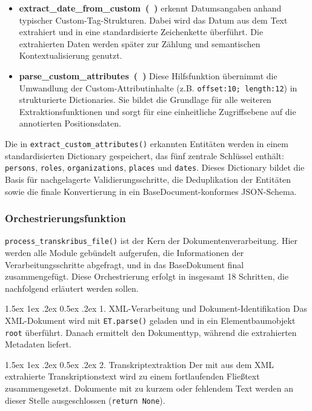 \documentclass[12pt, a4paper, ngerman, bidi=default]{article}
\makeatletter
\newcommand{\code}[1]{\colorbox{VeryLightGray}{\texttt{#1}}} %
\let\oldparagraph\paragraph%
\renewcommand{\paragraph}{
    \@ifstar%
      \xxxParagraphStar%
      \xxxParagraphNoStar%
 }
\newcommand{\xxxParagraphStar}[1]{\oldparagraph*{#1}\mbox{}}
\newcommand{\xxxParagraphNoStar}[1]{\oldparagraph{#1}\mbox{}}
\renewcommand\paragraph{\@startsection{paragraph}{4}{0em}%
  {1.5ex \@plus1ex \@minus.2ex}%
  {0.5ex \@plus.2ex}%
  {\normalfont\normalsize\bfseries\itshape}}
\makeatother
\begin{document}
\begin{itemize}
\item \textbf{extract\_date\_from\_custom~(~)} erkennt Datumsangaben anhand typischer Custom-Tag-Strukturen. Dabei wird das Datum aus dem Text extrahiert und in eine standardisierte Zeichenkette überführt. Die extrahierten Daten werden später zur Zählung und semantischen Kontextualisierung genutzt.

\item \textbf{parse\_custom\_attributes~(~)} Diese Hilfsfunktion übernimmt die Umwandlung der Custom-Attributinhalte (z.B. \code{offset:10; length:12}) in strukturierte Dictionaries. Sie bildet die Grundlage für alle weiteren Extraktionsfunktionen und sorgt für eine einheitliche Zugriffsebene auf die annotierten Positionsdaten.
\end{itemize}

Die in \code{extract\_custom\_attributes()} erkannten Entitäten werden in einem standardisierten Dictionary gespeichert, das fünf zentrale Schlüssel enthält: \code{persons}, \code{roles}, \code{organizations}, \code{places} und \code{dates}. Dieses Dictionary bildet die Basis für nachgelagerte Validierungsschritte, die Deduplikation der Entitäten sowie die finale Konvertierung in ein BaseDocument-konformes JSON-Schema.

\subsubsection{Orchestrierungsfunktion}
\code{process\_transkribus\_file()} ist der Kern der Dokumentenverarbeitung. Hier werden alle Module gebündelt aufgerufen, die Informationen der Verarbeitungsschritte abgefragt, und in das BaseDokument final zusammengefügt. Diese Orchestrierung erfolgt in insgesamt 18 Schritten, die nachfolgend erläutert werden sollen. 

\paragraph{1. XML-Verarbeitung und Dokument-Identifikation}
Das XML-Dokument wird mit \code{ET.parse()} geladen und in ein Elementbaumobjekt \code{root} überführt. Danach ermittelt \code{} den Dokumenttyp, während \code{} die extrahierten Metadaten liefert.

\paragraph{2. Transkriptextraktion}
Der mit  aus dem XML extrahierte Transkriptionstext wird zu einem fortlaufenden Fließtext zusammengesetzt. Dokumente mit zu kurzem oder fehlendem Text werden an dieser Stelle ausgeschlossen (\code{return None}).
\end{document}
